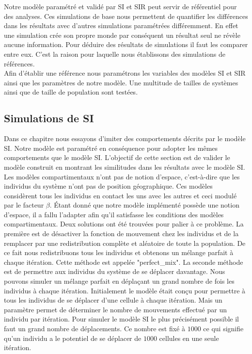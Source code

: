 Notre modèle paramétré et validé par SI et SIR peut servir de référentiel pour des analyses. Ces simulations de base nous permettent de quantifier les différences dans les résultats avec d'autres simulations paramétrées différemment. En effet une simulation crée son propre monde par conséquent un résultat seul ne révèle aucune information. Pour déduire des résultats de simulations il faut les comparer entre eux. C'est la raison pour laquelle nous établissons des simulations de références.\\

Afin d'établir une référence nous paramétrons les variables des modèles SI et SIR ainsi que les paramètres de notre modèle. Une multitude de tailles de systèmes ainsi que de taille de population sont testées.\\

\subsection{Simulations de SI}

Dans ce chapitre nous essayons d'imiter des comportements décrits par le modèle SI. Notre modèle est paramétré en conséquence pour adopter les mêmes comportements que le modèle SI. L'objectif de cette section est de valider le modèle construit en montrant les similitudes dans les résultats avec le modèle SI. \\

Les modèles compartimentaux n'ont pas de notion d'espace, c'est-à-dire que les individus du système n'ont pas de position géographique. Ces modèles considèrent tous les individus en contact les uns avec les autres et ceci modulé par le facteur $\beta$. Étant donné que notre modèle implémenté possède une notion d'espace, il a fallu l'adapter afin qu'il satisfasse les conditions des modèles compartimentaux. Deux solutions ont été trouvées pour palier à ce problème. La première est de désactiver la fonction de mouvement chez les individus et de la remplacer par une redistribution complète et aléatoire de toute la population. De ce fait nous redistribuons tous les individus et obtenons un mélange parfait à chaque itération. Cette méthode est appelée "perfect\_mix". La seconde méthode est de permettre aux individus du système de se déplacer davantage. Nous pouvons simuler un mélange parfait en déplaçant un grand nombre de fois les individus à chaque itération. Initialement le modèle était conçu pour permettre à tous les individus de se déplacer d'une cellule à chaque itération. Mais un paramètre permet de déterminer le nombre de mouvements effectué par un individu par itération. Pour simuler le modèle SI le plus précisément possible il faut un grand nombre de déplacements. Ce nombre est fixé à $1000$ ce qui signifie qu'un individu a le potentiel de se déplacer de $1000$ cellules en une seule itération.\\

